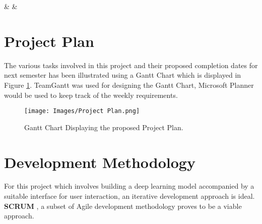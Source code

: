 \begin{longtable}
     &  & \\\hline

    \caption{Risk Analysis}
    
      \label{tab:Risk Analysis}
      \end{longtable}

\section{Project Plan}
The various tasks involved in this project and their proposed completion dates for next semester has 
been illustrated using a Gantt Chart which is displayed in Figure \ref{fig:Project Plan}. TeamGantt was used for 
designing the Gantt Chart, Microsoft Planner would be used to keep track of the weekly 
requirements.

\begin{figure}[H]
 \centering
 \texttt{[image: Images/Project Plan.png]}
 \caption[Project Plan]{Gantt Chart Displaying the proposed Project Plan.}
 \label{fig:Project Plan}
 \end{figure}

\section{Development Methodology}

For this project which involves building a deep learning model 
accompanied by a suitable interface for user interaction, 
an iterative development approach is ideal. \textbf{SCRUM} \cite{SCR}, 
a subset of Agile development methodology proves to be a viable approach. 

